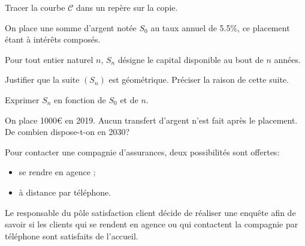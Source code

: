 \documentclass[a4paper,12pt]{scrartcl}
\begin{document}

 
 \subquestion{}
 Tracer la courbe $\mathcal{C}$ dans un repère sur la copie. 


On place une somme d'argent notée $S_0$ au taux annuel de 5.5\%, ce placement étant à intérêts composés.

Pour tout entier naturel $n$, $S_n$ désigne le capital disponible au bout de $n$ années.

\question{}
Justifier que la suite $(S_n)$ est géométrique. Préciser la raison de cette suite.


\question{}
Exprimer $S_n$ en fonction de $S_0$ et de $n$.


\question{}
On place 1000\euro{} en 2019. Aucun transfert d'argent n'est fait après le placement. De combien dispose-t-on en 2030?

 
 


Pour contacter une compagnie d'assurances, deux possibilités sont offertes:

\begin{itemize}
\item se rendre en agence ;
\item à distance par téléphone.
\end{itemize}

Le responsable du pôle \og{}satisfaction client\fg{} décide de réaliser une enquête afin de savoir si les clients qui se rendent en agence ou qui contactent la compagnie par téléphone sont satisfaits de l'accueil.
\end{document}
